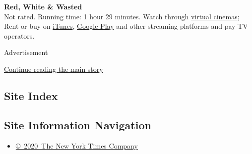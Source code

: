 \textbf{Red, White \& Wasted}\\
Not rated. Running time: 1 hour 29 minutes. Watch through
\href{https://www.laemmle.com/pages/laemmles-virtual-cinema}{virtual
cinemas}; Rent or buy on
\href{https://tv.apple.com/channel/tvs.sbd.4000?at=1000lDR\&itscg=MC_20000\&itsct=atvp_brand_omd\&mttnagencyid=1625\&mttncc=US\&mttngadurl=https\%3A\%2F\%2Ftv.apple.com\%2Fchannel\%2Ftvs.sbd.4000\%3F\&mttngmo=\&mttnmyad=459692074218\&mttnmysite=uqa99n2zg0\&mttnpid=305109\&mttnsiteid=143238\&mttnsub1=b\&mttnsub2=c\&mttnsub3=s4PxEfcjO_459692074218_uqa99n2zg0_c\&mttnsubad=OUS2019801-1\&mttnsubadgpname=kwd-340558734932\&mttnsubadgpref=75222218304\&mttnsubadref=\&mttnsubcmp=1746395698\&mttnsubkw=\%2Bapple\%20\%2Btv\%20\%2Bplus\&mttnsubpid=g\&mttnsubplmnt=}{iTunes},
\href{https://play.google.com/store?hl=en_US}{Google Play} and other
streaming platforms and pay TV operators.

Advertisement

\protect\hyperlink{after-bottom}{Continue reading the main story}

\hypertarget{site-index}{%
\subsection{Site Index}\label{site-index}}

\hypertarget{site-information-navigation}{%
\subsection{Site Information
Navigation}\label{site-information-navigation}}

\begin{itemize}
\tightlist
\item
  \href{https://help.nytimes3xbfgragh.onion/hc/en-us/articles/115014792127-Copyright-notice}{©~2020~The
  New York Times Company}
\end{itemize}


